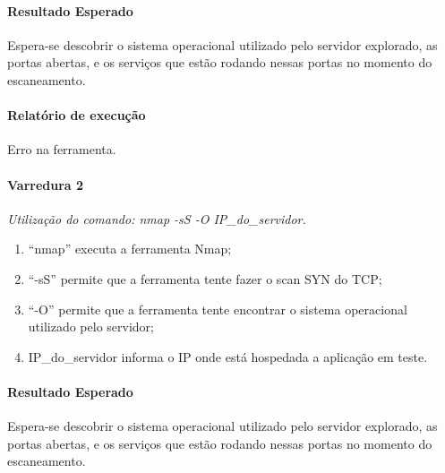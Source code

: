 \documentclass[
    12pt,               %
    openright,          %
    oneside,            %
    a4paper,            %
    section=TITLE,     %
    english,            %
    french,             %
    spanish,            %
    brazil              %
    ]{abntex2}
\begin{document}
\paragraph*{Resultado Esperado}

Espera-se descobrir o sistema operacional utilizado pelo servidor explorado, as portas abertas, e os serviços que estão rodando nessas portas no momento do escaneamento.



\paragraph*{Relatório de execução}

Erro na ferramenta.



\paragraph*{Varredura 2}

\emph{Utilização do comando: nmap -sS -O IP\_do\_servidor.}



\begin{enumerate}[start=1]
	
\item \textquotedblleft{}nmap\textquotedblright{} executa a ferramenta Nmap;
	
\item \textquotedblleft{}-sS\textquotedblright{} permite que a ferramenta tente fazer o scan SYN do TCP;
	
\item \textquotedblleft{}-O\textquotedblright{} permite que a ferramenta tente encontrar o sistema operacional utilizado pelo servidor;
	
\item IP\_do\_servidor informa o IP onde está hospedada a aplicação em teste.

\end{enumerate}


\paragraph*{Resultado Esperado}

Espera-se descobrir o sistema operacional utilizado pelo servidor explorado, as portas abertas, e os serviços que estão rodando nessas portas no momento do escaneamento.
\end{document}
